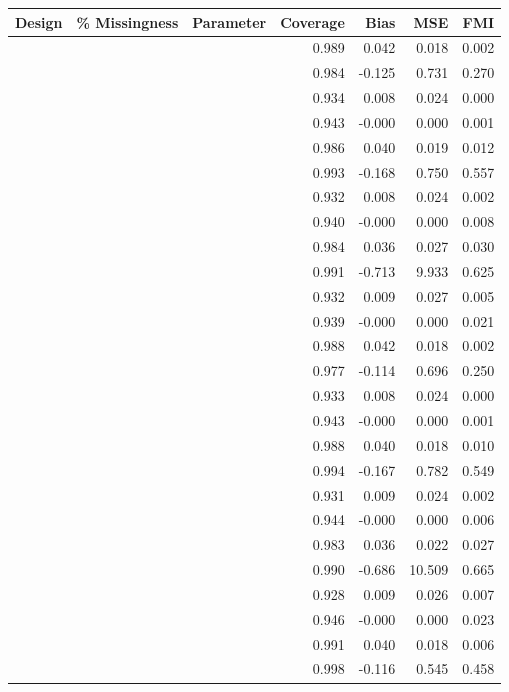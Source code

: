 \documentclass{svjour3}\usepackage[]{graphicx}\usepackage[]{color}
\begin{document}
\begin{table}[ht]
\centering
\begin{tabular}{lllrrrr}
  \hline
Design & \% Missingness  & Parameter & Coverage & Bias & MSE & FMI \\ 
  \hline
 &  &  & 0.989 & 0.042 & 0.018 & 0.002 \\ 
   &  &  & 0.984 & -0.125 & 0.731 & 0.270 \\ 
   &  &  & 0.934 & 0.008 & 0.024 & 0.000 \\ 
   &  &  & 0.943 & -0.000 & 0.000 & 0.001 \\ 
   \hline
   &  &  & 0.986 & 0.040 & 0.019 & 0.012 \\ 
   &  &  & 0.993 & -0.168 & 0.750 & 0.557 \\ 
   &  &  & 0.932 & 0.008 & 0.024 & 0.002 \\ 
   &  &  & 0.940 & -0.000 & 0.000 & 0.008 \\ 
   \hline
   &  &  & 0.984 & 0.036 & 0.027 & 0.030 \\ 
   &  &  & 0.991 & -0.713 & 9.933 & 0.625 \\ 
   &  &  & 0.932 & 0.009 & 0.027 & 0.005 \\ 
   &  &  & 0.939 & -0.000 & 0.000 & 0.021 \\ 
   \hline
   &  &  & 0.988 & 0.042 & 0.018 & 0.002 \\ 
   &  &  & 0.977 & -0.114 & 0.696 & 0.250 \\ 
   &  &  & 0.933 & 0.008 & 0.024 & 0.000 \\ 
   &  &  & 0.943 & -0.000 & 0.000 & 0.001 \\ 
   \hline
   &  &  & 0.988 & 0.040 & 0.018 & 0.010 \\ 
   &  &  & 0.994 & -0.167 & 0.782 & 0.549 \\ 
   &  &  & 0.931 & 0.009 & 0.024 & 0.002 \\ 
   &  &  & 0.944 & -0.000 & 0.000 & 0.006 \\ 
   \hline
   &  &  & 0.983 & 0.036 & 0.022 & 0.027 \\ 
   &  &  & 0.990 & -0.686 & 10.509 & 0.665 \\ 
   &  &  & 0.928 & 0.009 & 0.026 & 0.007 \\ 
   &  &  & 0.946 & -0.000 & 0.000 & 0.023 \\ 
   \hline
   &  &  & 0.991 & 0.040 & 0.018 & 0.006 \\ 
   &  &  & 0.998 & -0.116 & 0.545 & 0.458 \\ 

\end{tabular}
\end{table}
\end{document}
